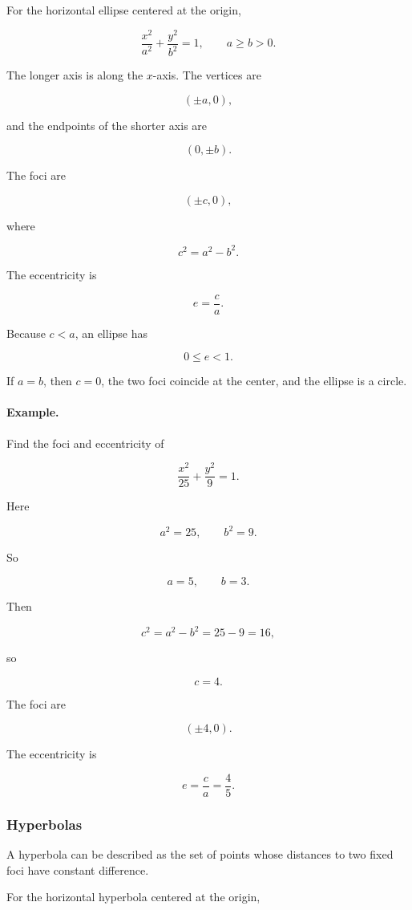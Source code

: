 For the horizontal ellipse centered at the origin,

\[
\boxed{
\frac{x^2}{a^2}+\frac{y^2}{b^2}=1,
\qquad
a\ge b>0.
}
\]

The longer axis is along the \(x\)-axis.  The vertices are

\[
(\pm a,0),
\]

and the endpoints of the shorter axis are

\[
(0,\pm b).
\]

The foci are

\[
(\pm c,0),
\]

where

\[
\boxed{
c^2=a^2-b^2.
}
\]

The eccentricity is

\[
\boxed{
e=\frac{c}{a}.
}
\]

Because \(c<a\), an ellipse has

\[
0\le e<1.
\]

If \(a=b\), then \(c=0\), the two foci coincide at the center, and the ellipse is a circle.

\paragraph{Example.}
Find the foci and eccentricity of

\[
\frac{x^2}{25}+\frac{y^2}{9}=1.
\]

Here

\[
a^2=25,
\qquad
b^2=9.
\]

So

\[
a=5,
\qquad
b=3.
\]

Then

\[
c^2=a^2-b^2=25-9=16,
\]

so

\[
c=4.
\]

The foci are

\[
(\pm4,0).
\]

The eccentricity is

\[
e=\frac{c}{a}=\frac45.
\]

\subsubsection*{Hyperbolas}

A hyperbola can be described as the set of points whose distances to two fixed foci have
constant difference.

For the horizontal hyperbola centered at the origin,

